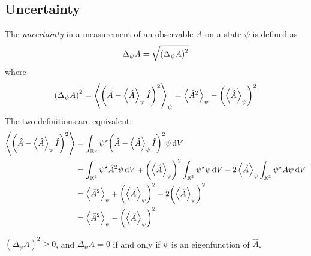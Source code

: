 \subsection{Uncertainty}
\begin{definition}
	The \textit{uncertainty} in a measurement of an observable \( A \) on a state \( \psi \) is defined as
	\[
		\Delta_\psi A = \sqrt{\qty(\Delta_\psi A)^2}
	\]
	where
	\[
		\qty(\Delta_\psi A)^2 = \left\langle{\qty(\hat A - \left\langle{\hat A}\right\rangle_\psi \hat I)^2}\right\rangle_\psi = \left\langle{\hat A^2}\right\rangle_\psi - \qty(\left\langle{\hat A}\right\rangle_\psi)^2
	\]
	The two definitions are equivalent:
	\begin{align*}
		\left\langle{\qty(\hat A - \left\langle{\hat A}\right\rangle_\psi \hat I)^2}\right\rangle & = \int_{\mathbb R^3} \psi^\star \qty(\hat A - \left\langle{\hat A}\right\rangle_\psi \hat I)^2 \psi \dd{V}                                                                                                          \\
		                                                    & = \int_{\mathbb R^3} \psi^\star \hat A^2 \psi \dd{V} + \qty(\left\langle{\hat A}\right\rangle_\psi)^2 \int_{\mathbb R^3} \psi^\star \psi \dd{V} - 2 \left\langle{\hat A}\right\rangle_\psi \int_{\mathbb R^3} \psi^\star A \psi \dd{V} \\
		                                                    & = \left\langle{\hat A^2}\right\rangle_{\psi} + \qty(\left\langle{\hat A}\right\rangle_{\psi})^2 - 2\qty(\left\langle{\hat A}\right\rangle_\psi)^2                                                                                                         \\
		                                                    & = \left\langle{\hat A^2}\right\rangle_{\psi} - \qty(\left\langle{\hat A}\right\rangle_{\psi})^2
	\end{align*}
\end{definition}
\begin{lemma}
	\( (\Delta_\psi A)^2 \geq 0 \), and \( \Delta_\psi A = 0 \) if and only if \( \psi \) is an eigenfunction of \( \hat A \).
\end{lemma}
